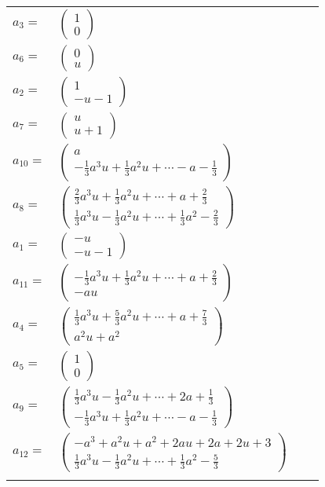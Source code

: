 \documentclass[1p]{elsarticle_modified}
\theoremstyle{definition}
\begin{document}
\begin{tabular}{m{7pt} m{180pt} m{7pt} m{180pt} }
\flushright $a_{3}=$&$\begin{pmatrix}1\\0\end{pmatrix}$ \\
\flushright $a_{6}=$&$\begin{pmatrix}0\\u\end{pmatrix}$ \\
\flushright $a_{2}=$&$\begin{pmatrix}1\\- u-1\end{pmatrix}$ \\
\flushright $a_{7}=$&$\begin{pmatrix}u\\u+1\end{pmatrix}$ \\
\flushright $a_{10}=$&$\begin{pmatrix}a\\-\frac{1}{3} a^3 u+\frac{1}{3} a^2 u+\cdots- a-\frac{1}{3}\end{pmatrix}$ \\
\flushright $a_{8}=$&$\begin{pmatrix}\frac{2}{3} a^3 u+\frac{1}{3} a^2 u+\cdots+a+\frac{2}{3}\\\frac{1}{3} a^3 u-\frac{1}{3} a^2 u+\cdots+\frac{1}{3} a^2-\frac{2}{3}\end{pmatrix}$ \\
\flushright $a_{1}=$&$\begin{pmatrix}- u\\- u-1\end{pmatrix}$ \\
\flushright $a_{11}=$&$\begin{pmatrix}-\frac{1}{3} a^3 u+\frac{1}{3} a^2 u+\cdots+a+\frac{2}{3}\\- a u\end{pmatrix}$ \\
\flushright $a_{4}=$&$\begin{pmatrix}\frac{1}{3} a^3 u+\frac{5}{3} a^2 u+\cdots+a+\frac{7}{3}\\a^2 u+a^2\end{pmatrix}$ \\
\flushright $a_{5}=$&$\begin{pmatrix}1\\0\end{pmatrix}$ \\
\flushright $a_{9}=$&$\begin{pmatrix}\frac{1}{3} a^3 u-\frac{1}{3} a^2 u+\cdots+2 a+\frac{1}{3}\\-\frac{1}{3} a^3 u+\frac{1}{3} a^2 u+\cdots- a-\frac{1}{3}\end{pmatrix}$ \\
\flushright $a_{12}=$&$\begin{pmatrix}- a^3+a^2 u+a^2+2 a u+2 a+2 u+3\\\frac{1}{3} a^3 u-\frac{1}{3} a^2 u+\cdots+\frac{1}{3} a^2-\frac{5}{3}\end{pmatrix}$\\&\end{tabular}
\end{document}
